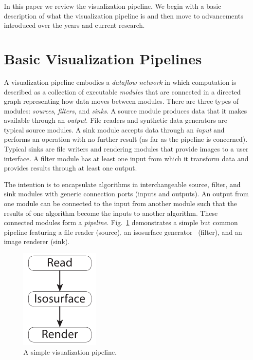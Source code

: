 \documentclass[journal,onecolumn,12pt,letterpaper,twoside]{IEEEtran}
\newcommand*{\lcite}[1]{~\cite{#1}}
\newcommand*{\figref}[1]{Fig.~\ref{#1}}
\newcommand*{\keyterm}[1]{\emph{#1}}
\begin{document}
In this paper we review the visualization pipeline.  We begin with a basic
description of what the visualization pipeline is and then move to
advancements introduced over the years and current research.


\section{Basic Visualization Pipelines}
\label{sec:BasicVisualizationPipelines}

A visualization pipeline embodies a \keyterm{dataflow network} in which
computation is described as a collection of executable \keyterm{modules}
that are connected in a directed graph representing how data moves between
modules.  There are three types of modules: \keyterm{sources},
\keyterm{filters}, and \keyterm{sinks}.  A source module produces data that
it makes available through an \keyterm{output}.  File readers and synthetic
data generators are typical source modules.  A sink module accepts data
through an \keyterm{input} and performs an operation with no further result
(as far as the pipeline is concerned).  Typical sinks are file writers and
rendering modules that provide images to a user interface.  A filter
module has at least one input from which it transform data and provides
results through at least one output.

The intention is to encapsulate algorithms in interchangeable source,
filter, and sink modules with generic connection ports (inputs and
outputs).  An output from one module can be connected to the input from
another module such that the results of one algorithm become the inputs
to another algorithm.  These connected modules form a
\keyterm{pipeline}.  \figref{fig:SimplePipeline} demonstrates a simple
but common pipeline featuring a file reader (source), an isosurface
generator\lcite{Lorensen1987} (filter), and an image renderer (sink).

\begin{figure}[htbp]
  \centering
  \includegraphics{images/SimplePipeline}
  \caption{A simple visualization pipeline.}
  \label{fig:SimplePipeline}
\end{figure}
\end{document}
